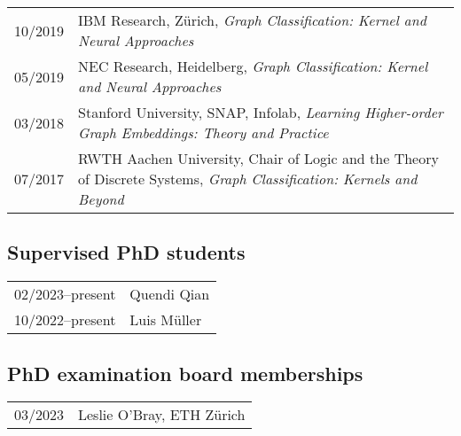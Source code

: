 \documentclass[11pt, a4paper, DIV=14, headings=small]{scrartcl}
\begin{document}
\begin{longtabu}{p{2.1cm}p{12.0cm}}
		10/2019 & IBM Research, Zürich, \emph{Graph Classification: Kernel and Neural Approaches}                                            \\
		05/2019 & NEC Research, Heidelberg, \emph{Graph Classification: Kernel and Neural Approaches}                                        \\
		03/2018 & Stanford University, SNAP, Infolab, \emph{Learning Higher-order Graph Embeddings: Theory and Practice}                     \\
		07/2017 & RWTH Aachen University, Chair of Logic and the Theory of Discrete Systems, \emph{Graph Classification: Kernels and Beyond} \\
	\end{longtabu}
	
	\subsection*{Supervised PhD students}
	\begin{longtabu}{p{2.1cm}p{12.0cm}}
		02/2023--present & Quendi Qian \\
		10/2022--present & Luis Müller \\
	\end{longtabu}
	
	\subsection*{PhD examination board memberships}
	\begin{longtabu}{p{2.1cm}p{12.0cm}}
		03/2023 &  Leslie O'Bray, ETH Zürich \\
	\end{longtabu}
	
\end{document}
